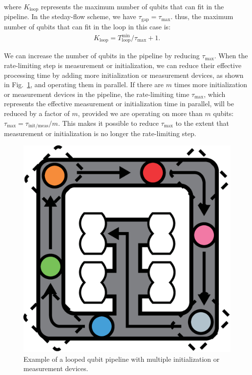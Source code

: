 \documentclass[a4paper,11pt]{ltjsarticle}
\begin{document}
{{        where $K_\text{loop}$ represents the maximum number of qubits that can fit in the pipeline. In the steday-flow scheme, we have $\tau_\text{gap} = \tau_\text{max}$. thus, the maximum number of qubits that can fit in the loop in this case is:
        \begin{align}
            K_\text{loop} = T_\text{loop}^\text{min}/\tau_\text{max} + 1.
        \end{align}

        We can increase the number of qubits in the pipeline by reducing $\tau_\text{max}$. When the rate-limiting step is measurement or initialization, we can reduce their effective processing time by adding more initialization or measurement devices, as shown in Fig.~\ref{more_devices}, and operating them in parallel. If there are $m$ times more initialization or measurement devices in the pipeline, the rate-limiting time $\tau_\text{max}$, which represents the effective measurement or initialization time in parallel, will be reduced by a factor of $m$, provided we are operating on more than $m$ qubits: $\tau_\text{max} = \tau_\text{init/meas}/m$. This makes it possible to reduce $\tau_\text{max}$ to the extent that measurement or initialization is no longer the rate-limiting step.

        \begin{figure}[h]
            \centering
            \includegraphics[scale=0.20]{figure/more_devices.eps}
            \vspace{0pt}\caption{Example of a looped qubit pipeline with multiple
            initialization or measurement devices.}
            \label{more_devices}
        \end{figure}
    }
}
\end{document}
